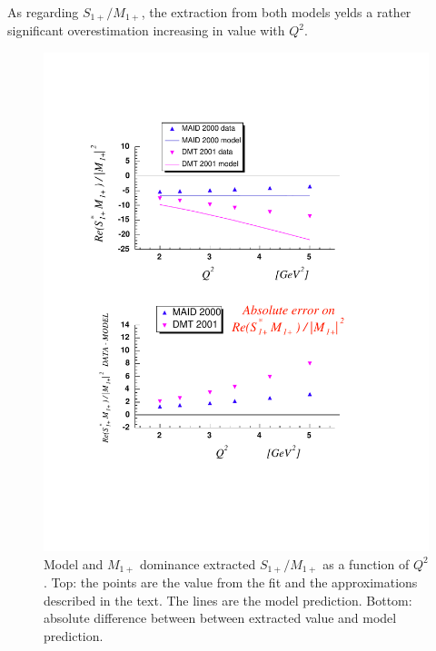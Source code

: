 As regarding $S_{1+}/M_{1+}$, the extraction from both models yelds a rather significant overestimation 
increasing in value with $Q^2$.
 
\begin{figure}[h]
 \begin{center}
 \includegraphics[width = 12cm, bb=30 130 560 720]{analysis/img/error_rs} 
  \caption[Model and extracted $S_{1+}/M_{1+}$ as a function of $Q^2$]
          {  Model and $M_{1+}$ dominance extracted $S_{1+}/M_{1+}$ as a function of $Q^2$. Top: 
	              the points are the value from the fit and the approximations described in
		      the text. The lines
		      are the model prediction. Bottom: absolute difference between between
		      extracted value and model prediction.}
 \label{fig:error_rs}
\end{center}
\end{figure}


















